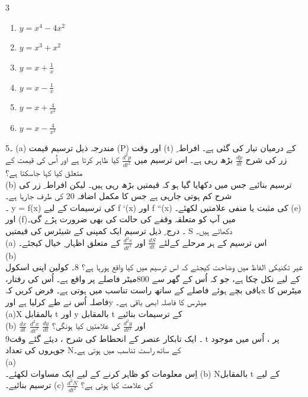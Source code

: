  \begin{multicols}{3}
  \begin{enumerate}[.a]
  \item \( y=x^4-4x^2 \) 
  \item \( y=x^3+x^2 \)
  \item \( y=x+\frac{1}{x} \)
  \item \( y=x-\frac{1}{x} \) 
  \item \( y=x+\frac{4}{x^2} \)
  \item \( y=x-\frac{4}{x^2} \) 
  \end{enumerate}
  \end{multicols}
5۔  (a)  مندرجہ ذیل ترسیم قیمت (P) اور وقت (t) کے درمیان تیار کی گئی ہے۔ افراط  ِ زر کی شرح   
\(\frac{dp}{dt}\)
بڑھ رہی ہے۔ اس ترسیم میں  
\(\frac{d^{2}p}{dt^{2}}\)
 کیا ظاہر کرتا ہے اور اُس کی قیمت کے متعلق کیا کہا جاسکتا ہے؟\\
(b) ترسیم بنائیے جس میں دکھایا گیا ہو کہ قیمتیں بڑھ رہی ہیں۔  لیکن افراط  ِ زر کی شرح کم ہوتی جارہی ہے جس کا مکمل اضافہ 20   کی طرف جارہا ہے۔\\ 
۔  y = f(x) کی ترسیمات کے لیے f `(x) اور f ``(x)  کی مثبت یا منفی علامتیں لکھئے۔ (e)  اور   (f)میں آپ کو متعلقہ وقفے کی حالت کی بھی ضرورت پڑے گی۔ \\
۔ درج  ِ ذیل ترسیم ایک کمپنی کے شیئرس کی قیمتیں S دکھاتے ہیں۔\\
(a) اس ترسیم کے ہر مرحلے کےلئے 
\(\frac{dS}{dt}\)
اور
\(\frac{d^{2}s}{dt^{2}}\)
 کے متعلق اظہار ِ خیال کیجئے۔ \\
(b) \\غیر تکنیکی الفاظ میں وضاحت کیجئے کہ اس ترسیم میں کیا واقع ہورہا  ہے؟
8۔ کولین اپنی اسکول کے لیے نکل چکا ہے،  جو کہ اُس کے گھر سے 800میٹر فاصلے پر واقع ہے۔  اُس کی رفتار،  باقی بچے ہوئے فاصلے کے ساتھ راست تناسب میں ہوتی ہے۔ فرض کریں کہx  میٹرس کا فاصلہ اُس نے طے کرلیا ہے اورy  میٹرس کا فاصلہ ابھی باقی ہے۔ \\
	(a)X
	  بالمقابل t
	اور
	y
	بالمقابل 
	t
	کے ترسیمات بنائیے\\
	(b)
	  \(\frac{dx}{dt}\)
	  \(\frac{d^{2}x}{dt^{2}}\)
	  \(\frac{dy}{dt}\)
	 اور
    \(\frac{d^{2}y}{dt{^2}}\)
	  کی علامتیں کیا ہونگی؟\\
9۔ ایک تابکار عنصر کے انحطاط کی شرح ، دیئے گئے وقت t پر ،  اُس میں موجود جوہروں کی تعداد  Nکے ساتھ راست تناسب میں ہوتی ہے۔\\
	(a)	\\اِس معلومات کو ظاہر کرنے کے لیے ایک مساوات لکھئے۔
(b)	 Nبالمقابل  t کے لیے ترسیم بنائیے۔
	(c)	 \(\frac{d^{2}N}{dt^{2}}\)
	  کی علامت کیا ہوتی ہے؟\\
	
